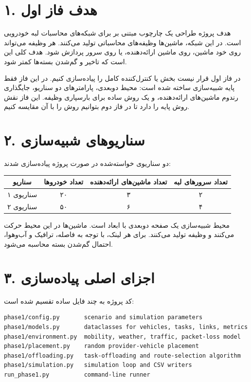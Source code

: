 \documentclass[12pt]{exam}
\begin{document}
\begin{questions}
\question

\section*{۱. هدف فاز اول}
هدف پروژه طراحی یک چارچوب مبتنی بر  برای شبکه‌های محاسبات لبه خودرویی
است. در این شبکه، ماشین‌ها وظیفه‌های محاسباتی تولید می‌کنند. هر وظیفه می‌تواند
روی خود ماشین، روی ماشین ارائه‌دهنده، یا روی سرور  پردازش شود. هدف کلی
این است که تاخیر و گم‌شدن بسته‌ها کمتر شود.

در فاز اول قرار نیست بخش  یا کنترل‌کننده  کامل را پیاده‌سازی کنیم.
در این فاز فقط پایه شبیه‌سازی ساخته شده است: محیط دوبعدی، پارامترهای دو سناریو،
جایگذاری رندوم ماشین‌های ارائه‌دهنده، و یک روش ساده برای بارسپاری وظیفه. این
فاز نقش روش پایه را دارد تا در فاز دوم بتوانیم روش  را با آن مقایسه کنیم.

\section*{۲. سناریوهای شبیه‌سازی}
دو سناریوی خواسته‌شده در صورت پروژه پیاده‌سازی شدند:

\begin{center}
\begin{tabular}{|c|c|c|c|}
\hline
سناریو & تعداد خودروها & تعداد ماشین‌های ارائه‌دهنده & تعداد سرورهای لبه \\
\hline
سناریوی ۱ & ۲۰ & ۳ & ۲ \\
\hline
سناریوی ۲ & ۵۰ & ۶ & ۴ \\
\hline
\end{tabular}
\end{center}

محیط شبیه‌سازی یک صفحه دوبعدی با ابعاد  است. ماشین‌ها
در این محیط حرکت می‌کنند و وظیفه تولید می‌کنند. برای هر لینک، با توجه به فاصله،
ترافیک و آب‌وهوا، احتمال گم‌شدن بسته محاسبه می‌شود.

\section*{۳. اجزای اصلی پیاده‌سازی}
کد پروژه به چند فایل ساده تقسیم شده است:

\begin{latin}
\begin{lstlisting}
phase1/config.py       scenario and simulation parameters
phase1/models.py       dataclasses for vehicles, tasks, links, metrics
phase1/environment.py  mobility, weather, traffic, packet-loss model
phase1/placement.py    random provider-vehicle placement
phase1/offloading.py   task-offloading and route-selection algorithm
phase1/simulation.py   simulation loop and CSV writers
run_phase1.py          command-line runner
\end{lstlisting}
\end{latin}


\end{questions}
\end{document}
